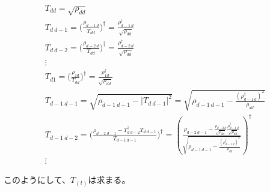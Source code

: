 \documentclass[11pt,a4j,notitlepage]{jreport}
\begin{document}
	\begin{equation*}
		\begin{gathered}
			T_{dd} = \sqrt{\rho_{dd}} \\
			T_{d\ d-1} = \Big( \frac{\rho_{d-1\ d}}{T_{dd}} \Big)^\dagger = \frac{\rho_{d-1\ d}^\dagger}{\sqrt{\rho_{dd}}} \\
			T_{d\ d-2} = \Big( \frac{\rho_{d-2\ d}}{T_{dd}} \Big)^\dagger = \frac{\rho_{d-2\ d}^\dagger}{\sqrt{\rho_{dd}}} \\
			\vdots \\
			T_{d1} = \Big( \frac{\rho_{1d}}{T_{dd}} \Big)^\dagger = \frac{\rho_{1d}^\dagger}{\sqrt{\rho_{dd}}} \\
			T_{d-1\ d-1} = \sqrt{\rho_{d-1\ d-1} - | T_{d\ d-1} |^2} = \sqrt{\rho_{d-1\ d-1} - \frac{(\rho_{d-1\ d}^\dagger)^2}{\rho_{dd}}} \\
			T_{d-1\ d-2} = \Bigg(\frac{\rho_{d-2\ d-1} - T_{d\ d-2}^\dagger T_{d\ d-1}}{T_{d-1\ d-1}} \Bigg)^\dagger = \left( \frac{\rho_{d-2\ d-1} - \frac{\rho_{d-2\ d}}{\sqrt{\rho_{dd}}} \frac{\rho_{d-1\ d}^\dagger}{\sqrt{\rho_{dd}}}}{\sqrt{\rho_{d-1\ d-1} - \frac{(\rho_{d-1\ d}^\dagger)^2 }{\rho_{dd}}}} \right)^\dagger \\
			\vdots
		\end{gathered}
	\end{equation*}

	このようにして、$T_{(t)}$は求まる。
\end{document}
